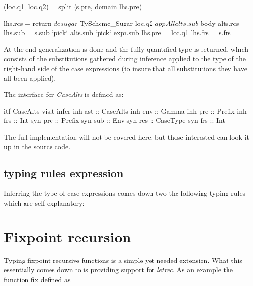 \begin{code}       
   (loc.q1, loc.q2) = split (s.pre, domain lhs.pre)
   
   lhs.res = return $ desugar $ TyScheme_Sugar loc.q2 $ appAll alts.sub $ body alts.res
   lhs.sub = s.sub `pick` alts.sub `pick` expr.sub
   lhs.pre = loc.q1
   lhs.frs = s.frs
\end{code}
At the end generalization is done and the fully quantified type is returned, which consists of the substitutions gathered during inference applied to the type of the right-hand side of the case expressions (to insure that all substitutions they have all been applied). 

The interface for \emph{CaseAlts} is defined as:
\begin{code}
itf CaseAlts
  visit infer
    inh ast :: CaseAlts
    inh env :: Gamma
    inh pre :: Prefix
    inh frs :: Int
    syn pre :: Prefix
    syn sub :: Env
    syn res :: CaseType
    syn frs :: Int 
\end{code}

The full implementation will not be covered here, but those interested can look it up in the source code.

\subsection{typing rules expression}
Inferring the type of case expressions comes down two the following typing rules which are self explanatory:

\begin{prooftree}
\end{prooftree}

\begin{prooftree}
\end{prooftree} 
\section{Fixpoint recursion}
Typing fixpoint recursive functions is a simple yet needed extension. What this essentially comes down to is providing support for \emph{letrec}. As an example the function fix defined as

